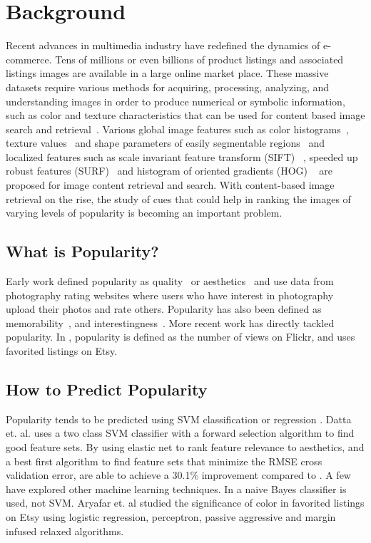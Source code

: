 \documentclass[conference,a4paper]{IEEEtran}
\begin{document}
\section{Background}
\label{sec:background}
Recent advances in multimedia industry have redefined the dynamics of
e-commerce. Tens of millions or even billions of product listings and associated listings images are
available in a large online market place. These massive datasets require various methods for acquiring, processing,
analyzing, and understanding images in order to produce numerical or symbolic
information, such as color and texture characteristics that can be used for content based image search and retrieval~\cite{
  bhardwajpalette,zhou2012document,faloutsos1994efficient}. 
Various global image features such as color histograms~\cite{rao1999spatial}, texture
values~\cite{haralick1979statistical} and shape parameters of easily segmentable regions~\cite{niblack1993qbic} and localized features such
as scale invariant feature transform (SIFT) ~\cite{lowe2004distinctive}, speeded up
robust features (SURF)~\cite{bay2006surf} and histogram of oriented gradients (HOG)
~\cite{dalal2005histograms} are proposed for image content retrieval
and search.  With content-based image retrieval on the rise, the study of cues that
could help in ranking the images of varying levels of popularity is becoming an important problem.

\subsection{What is Popularity?}
Early work defined popularity as quality~\cite{ke2006design} or aesthetics~\cite{datta2006studying} and use data from photography rating websites where users who have interest in photography upload their photos and rate others.  Popularity has also been defined as memorability~\cite{isola2011makes}, and interestingness~\cite{dhar2011high,gygli2013interestingness}.  More recent work has directly tackled popularity.  In \cite{khosla2014makes}, popularity is defined as the number of views on Flickr, and \cite{aryafar2014exploring} uses favorited listings on Etsy.

\subsection{How to Predict Popularity}
Popularity tends to be predicted using SVM classification or regression \cite{datta2006studying} \cite{khosla2014makes} \cite{chen2014aesthetic} \cite{wang2015automatic}.  Datta et. al. \cite{datta2006studying} uses a two class SVM classifier with a forward selection algorithm to find good feature sets.  By using elastic net to rank feature relevance to aesthetics, and a best first algorithm to find feature sets that minimize the RMSE cross validation error, \cite{wang2015automatic} are able to achieve a 30.1\% improvement compared to \cite{chen2014aesthetic}.  A few have explored other machine learning techniques.  In \cite{ke2006design} a naive Bayes classifier is used, not SVM.  Aryafar et. al \cite{aryafar2014exploring} studied the significance of color in favorited listings on Etsy using logistic regression, perceptron, passive aggressive and margin infused relaxed algorithms.
\end{document}
